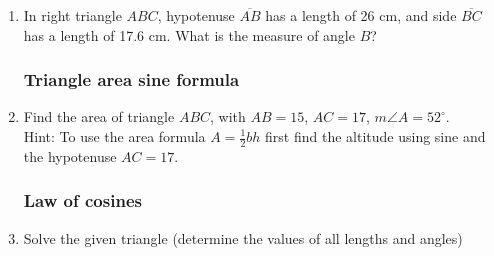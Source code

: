 \documentclass[12pt, twoside]{article}
\begin{document}
\begin{enumerate}
\newpage
   \item In right triangle $ABC$, hypotenuse $\overline{AB}$ has a length of 26 cm, and side $\overline{BC}$ has a length of 17.6 cm. What is the measure of angle $B$?

\newpage
\subsubsection*{Triangle area sine formula}
   \item Find the area of triangle $ABC$, with $AB=15$, $AC=17$, $m\angle A = 52^\circ$. \\[0.5cm]
   Hint: To use the area formula $A = \frac{1}{2} bh$ first find the altitude using sine and the hypotenuse $AC=17$.
   \begin{flushleft}
     \end{flushleft} 

\newpage
\subsubsection*{Law of cosines}
  \item Solve the given triangle (determine the values of all lengths and angles)
  \begin{center}
    \end{center}

\newpage

\end{enumerate}
\end{document}
